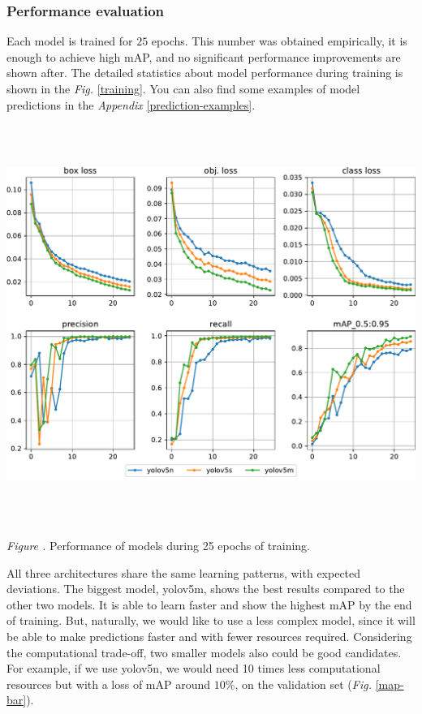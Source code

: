 \documentclass[14pt,a4paper]{extarticle}
\newcounter{e}
\newcounter{pic}
\newcommand{\pic}[1]{\refstepcounter{pic} \vspace{-0.3cm}\textit{Figure \arabic{pic}\label{#1}.}}
\numberwithin{equation}{section}
\numberwithin{figure}{section}
\begin{document}
\subsubsection{Performance evaluation}
Each model is trained for $25$ epochs. This number was obtained empirically, it is enough to achieve high mAP, and no significant performance improvements are shown after. The detailed statistics about model performance during training is shown in the \textit{Fig.} \ref{training}. You can also find some examples of model predictions in the \textit{Appendix} \ref{prediction-examples}.

\begin{center}
    \includegraphics[height=13cm]{images/results.pdf}
\end{center}
\begin{center}
    \pic{training} Performance of models during 25 epochs of training.
\end{center}
All three architectures share the same learning patterns, with expected deviations. The biggest model, yolov5m, shows the best results compared to the other two models. It is able to learn faster and show the highest mAP by the end of training.
But, naturally, we would like to use a less complex model, since it will be able to make predictions faster and with fewer resources required. Considering the computational trade-off, two smaller models also could be good candidates. For example, if we use yolov5n, we would need 10 times less computational resources but with a loss of mAP around $10\%$, on the validation set (\textit{Fig.} \ref{map-bar}).
\end{document}
